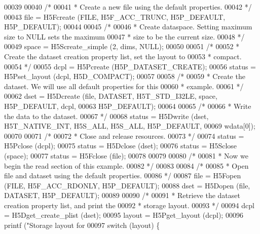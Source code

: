 \begin{DoxyCode}
00039 
00040     \textcolor{comment}{/*}
00041 \textcolor{comment}{     * Create a new file using the default properties.}
00042 \textcolor{comment}{     */}
00043     file = H5Fcreate (FILE, H5F\_ACC\_TRUNC, H5P\_DEFAULT, H5P\_DEFAULT);
00044 
00045     \textcolor{comment}{/*}
00046 \textcolor{comment}{     * Create dataspace.  Setting maximum size to NULL sets the maximum}
00047 \textcolor{comment}{     * size to be the current size.}
00048 \textcolor{comment}{     */}
00049     space = H5Screate\_simple (2, dims, NULL);
00050 
00051     \textcolor{comment}{/*}
00052 \textcolor{comment}{     * Create the dataset creation property list, set the layout to}
00053 \textcolor{comment}{     * compact.}
00054 \textcolor{comment}{     */}
00055     dcpl = H5Pcreate (H5P\_DATASET\_CREATE);
00056     status = H5Pset\_layout (dcpl, H5D\_COMPACT);
00057 
00058     \textcolor{comment}{/*}
00059 \textcolor{comment}{     * Create the dataset.  We will use all default properties for this}
00060 \textcolor{comment}{     * example.}
00061 \textcolor{comment}{     */}
00062     dset = H5Dcreate (file, DATASET, H5T\_STD\_I32LE, space, H5P\_DEFAULT, dcpl,
00063                 H5P\_DEFAULT);
00064 
00065     \textcolor{comment}{/*}
00066 \textcolor{comment}{     * Write the data to the dataset.}
00067 \textcolor{comment}{     */}
00068     status = H5Dwrite (dset, H5T\_NATIVE\_INT, H5S\_ALL, H5S\_ALL, H5P\_DEFAULT,
00069                 wdata[0]);
00070 
00071     \textcolor{comment}{/*}
00072 \textcolor{comment}{     * Close and release resources.}
00073 \textcolor{comment}{     */}
00074     status = H5Pclose (dcpl);
00075     status = H5Dclose (dset);
00076     status = H5Sclose (space);
00077     status = H5Fclose (file);
00078 
00079 
00080     \textcolor{comment}{/*}
00081 \textcolor{comment}{     * Now we begin the read section of this example.}
00082 \textcolor{comment}{     */}
00083 
00084     \textcolor{comment}{/*}
00085 \textcolor{comment}{     * Open file and dataset using the default properties.}
00086 \textcolor{comment}{     */}
00087     file = H5Fopen (FILE, H5F\_ACC\_RDONLY, H5P\_DEFAULT);
00088     dset = H5Dopen (file, DATASET, H5P\_DEFAULT);
00089 
00090     \textcolor{comment}{/*}
00091 \textcolor{comment}{     * Retrieve the dataset creation property list, and print the}
00092 \textcolor{comment}{     * storage layout.}
00093 \textcolor{comment}{     */}
00094     dcpl = H5Dget\_create\_plist (dset);
00095     layout = H5Pget\_layout (dcpl);
00096     printf (\textcolor{stringliteral}{"Storage layout for %
00097     \textcolor{keywordflow}{switch} (layout) \{
}
\end{DoxyCode}
